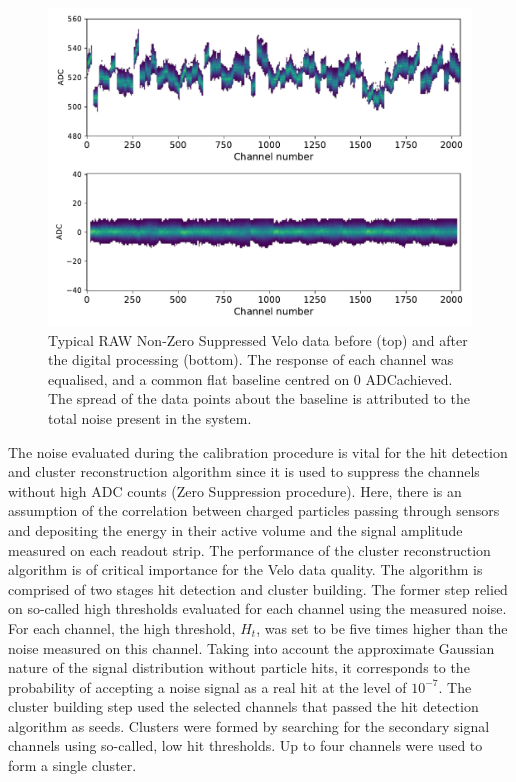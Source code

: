 \begin{figure}
    \centering
    \includegraphics[width=0.7\linewidth]{figures/chapter2/pre_post_cali.pdf}
    \caption[thing]{Typical RAW Non-Zero Suppressed Velo data before (top) and after the digital processing (bottom). The response of each channel was equalised, and a common flat baseline centred on 0 ADC\footnotemark achieved. The spread of the data points about the baseline is attributed to the total noise present in the system.}
    \label{plot:postcal}
\end{figure}


The noise evaluated during the calibration procedure is vital for the hit detection and cluster reconstruction algorithm since it is used to suppress the channels without high ADC counts (Zero Suppression procedure). Here, there is an assumption of the correlation between charged particles passing through sensors and depositing the energy in their active volume and the signal amplitude measured on each readout strip.
The performance of the cluster reconstruction  algorithm is of critical importance for the Velo data quality.
The algorithm is comprised of two stages hit detection and cluster building.
The former step relied on so-called high thresholds evaluated for each channel using the measured noise.
For each channel, the high threshold, $H_t$, was set to be five times higher than the noise measured on this channel.
Taking into account the approximate Gaussian nature of the signal distribution without particle hits, it corresponds to the probability of accepting a noise signal as a real hit at the level of $10^{-7}$.
The cluster building step used the selected channels that passed the hit detection algorithm as seeds.
Clusters were formed by searching for the secondary signal channels using so-called, low hit thresholds.
Up to four channels were used to form a single cluster.

